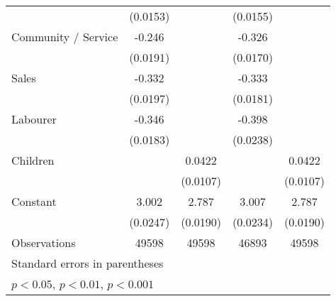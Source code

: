 {\begin{tabular}{l*{4}{c}}
                    &    (0.0153)         &                     &    (0.0155)         &                     \\
[1em]
Community / Service &      -0.246\sym{***}&                     &      -0.326\sym{***}&                     \\
                    &    (0.0191)         &                     &    (0.0170)         &                     \\
[1em]
Sales               &      -0.332\sym{***}&                     &      -0.333\sym{***}&                     \\
                    &    (0.0197)         &                     &    (0.0181)         &                     \\
[1em]
Labourer            &      -0.346\sym{***}&                     &      -0.398\sym{***}&                     \\
                    &    (0.0183)         &                     &    (0.0238)         &                     \\
[1em]
Children            &                     &      0.0422\sym{***}&                     &      0.0422\sym{***}\\
                    &                     &    (0.0107)         &                     &    (0.0107)         \\
[1em]
Constant            &       3.002\sym{***}&       2.787\sym{***}&       3.007\sym{***}&       2.787\sym{***}\\
                    &    (0.0247)         &    (0.0190)         &    (0.0234)         &    (0.0190)         \\
\hline
Observations        &       49598         &       49598         &       46893         &       49598         \\
\hline\hline
\multicolumn{5}{l}{\footnotesize Standard errors in parentheses}\\
\multicolumn{5}{l}{\footnotesize \sym{*} \(p<0.05\), \sym{**} \(p<0.01\), \sym{***} \(p<0.001\)}\\
\end{tabular}
}
